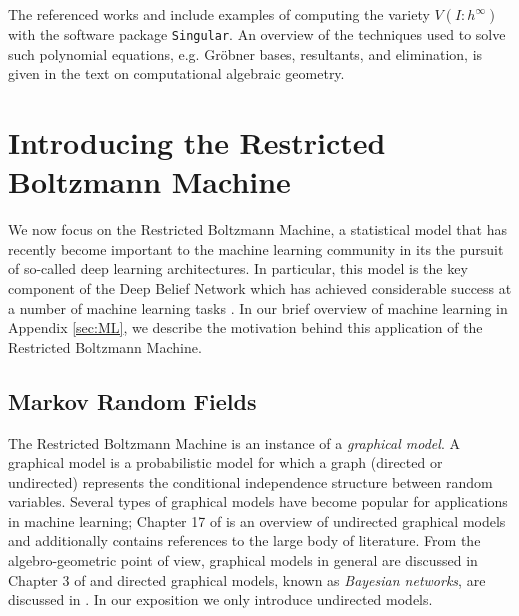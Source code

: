 \documentclass[cclicense]{hmcthesis}
\numberwithin{equation}{section}
\begin{document}
    The referenced works \citep{ASCB} and \citep{DSS08} include examples of
    computing the variety $V(I : h^\infty)$ with the software package
    \texttt{Singular}.  An overview of the techniques used to solve such
    polynomial equations, e.g. Gröbner bases, resultants, and elimination, is
    given in the text \citep{CLO05} on computational algebraic geometry.
% 






\chapter{Introducing the Restricted Boltzmann Machine}

    We now focus on the Restricted Boltzmann Machine, a statistical model that
    has recently become important to the machine learning community in its the
    pursuit of so-called deep learning architectures.  In particular, this
    model is the key component of the Deep Belief Network which has achieved
    considerable success at a number of machine learning tasks \citep{Hin07}.  In
    our brief overview of machine learning in Appendix \ref{sec:ML}, we describe
    the motivation behind this application of the Restricted Boltzmann Machine.

\section{Markov Random Fields}
    \label{sec:rbm-def}

    The Restricted Boltzmann Machine is an instance of a \emph{graphical model}.
    A graphical model is a probabilistic model for which a graph (directed or
    undirected) represents the conditional independence structure between random
    variables.  Several types of graphical models have become popular for
    applications in machine learning; Chapter 17 of \citep{EOSL} is an overview
    of undirected graphical models and additionally contains references to the
    large body of literature.  From the algebro-geometric point of view,
    graphical models in general are discussed in Chapter 3 of \citep{DSS08} and
    directed graphical models, known as \emph{Bayesian networks}, are discussed
    in \citep{GSS}.  In our exposition we only introduce undirected models.
\end{document}
